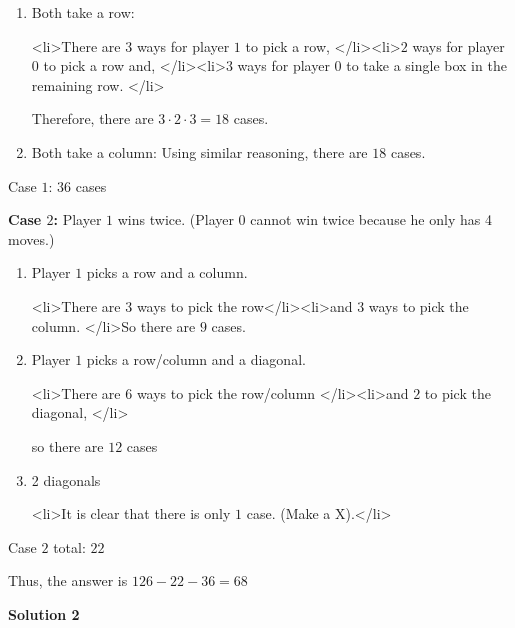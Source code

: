 \begin{enumerate}
 
            \begin{enumerate}
        \item Both take a row: 
            \begin{itemize}<li>There are $3$ ways for player $1$ to pick a row, </li><li>$2$ ways for player $0$ to pick a row and, </li><li>$3$ ways for player $0$ to take a single box in the remaining row. </li>
            \end{itemize}
            Therefore, there are $3 \cdot 2 \cdot 3=18$ cases.

 
        \item Both take a column: Using similar reasoning, there are $18$ cases.
            \end{enumerate}
            Case $1$: $36$ cases

 


 \textbf{Case $2$:} Player $1$ wins twice. (Player $0$ cannot win twice because he only has 4 moves.)

 
            \begin{enumerate}
        \item Player $1$ picks a row and a column.
            \begin{itemize}<li>There are $3$ ways to pick the row</li><li>and $3$ ways to pick the column. </li>So there are $9$ cases.
            \end{itemize}
            
        \item Player $1$ picks a row/column and a diagonal.
            \begin{itemize}<li>There are $6$ ways to pick the row/column </li><li>and $2$ to pick the diagonal, </li>
            \end{itemize}
            so there are $12$ cases

 
        \item 2 diagonals
            \begin{itemize}<li>It is clear that there is only $1$ case. (Make a X).</li>
            \end{itemize}
            
            \end{enumerate}
            Case $2$ total: $22$

 


 Thus, the answer is $126-22-36=\boxed{68}$




\textbf{Solution 2}


\end{enumerate}
